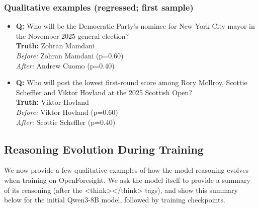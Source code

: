 \subsubsection*{Qualitative examples (regressed; first sample)}
\begin{itemize}


\item \textbf{Q:} Who will be the Democratic Party's nominee for New York City mayor in the November 2025 general election? \\
\textbf{Truth:} Zohran Mamdani \\
\emph{Before:} Zohran Mamdani (p=0.60) \\
\emph{After:} Andrew Cuomo (p=0.40)

\item \textbf{Q:} Who will post the lowest first-round score among Rory McIlroy, Scottie Scheffler and Viktor Hovland at the 2025 Scottish Open? \\
\textbf{Truth:} Viktor Hovland \\
\emph{Before:} Viktor Hovland (p=0.60) \\
\emph{After:} Scottie Scheffler (p=0.40)
\end{itemize}

\subsection{Reasoning Evolution During Training}
\label{sec:reasoning_evolution}

We now provide a few qualitative examples of how the model reasoning evolves when training on OpenForesight. We ask the model itself to provide a summary of its reasoning (after the <think></think> tags), and show this summary below for the initial Qwen3-8B model, followed by training checkpoints.



